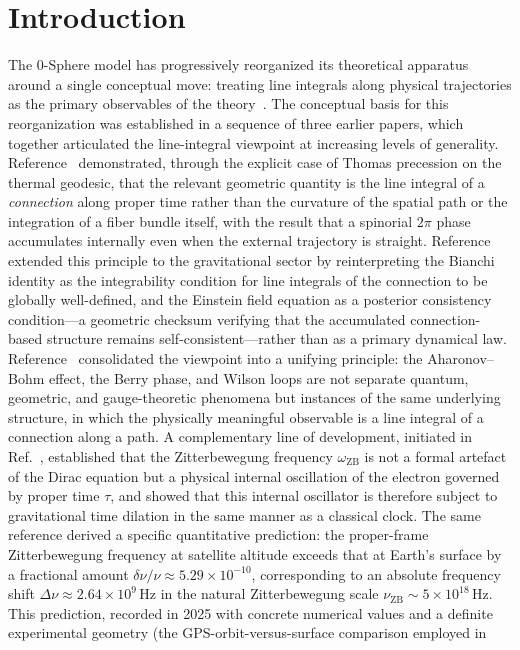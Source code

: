 \documentclass[%
 reprint, amsmath,amssymb, aps, prb, ]{revtex4-2}
\numberwithin{equation}{section}
\newcommand{\omZB}{\omega_{\text{ZB}}}
\begin{document}
\begin{abstract}
\end{abstract}

\maketitle

\section{Introduction}
\label{sec:intro}

The 0-Sphere model has progressively reorganized its theoretical apparatus around a single conceptual move: treating line integrals along physical trajectories as the primary observables of the theory~\cite{hanamura29, hanamura31, hanamura40, hanamura41}. The conceptual basis for this reorganization was established in a sequence of three earlier papers, which together articulated the line-integral viewpoint at increasing levels of generality. Reference~\cite{hanamura29} demonstrated, through the explicit case of Thomas precession on the thermal geodesic, that the relevant geometric quantity is the line integral of a \emph{connection} along proper time rather than the curvature of the spatial path or the integration of a fiber bundle itself, with the result that a spinorial $2\pi$ phase accumulates internally even when the external trajectory is straight. Reference~\cite{hanamura30} extended this principle to the gravitational sector by reinterpreting the Bianchi identity as the integrability condition for line integrals of the connection to be globally well-defined, and the Einstein field equation as a posterior consistency condition---a geometric checksum verifying that the accumulated connection-based structure remains self-consistent---rather than as a primary dynamical law. Reference~\cite{hanamura31} consolidated the viewpoint into a unifying principle: the Aharonov--Bohm effect, the Berry phase, and Wilson loops are not separate quantum, geometric, and gauge-theoretic phenomena but instances of the same underlying structure, in which the physically meaningful observable is a line integral of a connection along a path. A complementary line of development, initiated in Ref.~\cite{hanamura22}, established that the Zitterbewegung frequency $\omZB$ is not a formal artefact of the Dirac equation but a physical internal oscillation of the electron governed by proper time $\tau$, and showed that this internal oscillator is therefore subject to gravitational time dilation in the same manner as a classical clock. The same reference derived a specific quantitative prediction: the proper-frame Zitterbewegung frequency at satellite altitude exceeds that at Earth's surface by a fractional amount $\delta\nu/\nu \approx 5.29 \times 10^{-10}$, corresponding to an absolute frequency shift $\Delta\nu \approx 2.64 \times 10^{9}\,\text{Hz}$ in the natural Zitterbewegung scale $\nu_{\text{ZB}} \sim 5 \times 10^{18}\,\text{Hz}$. This prediction, recorded in 2025 with concrete numerical values and a definite experimental geometry (the GPS-orbit-versus-surface comparison employed in 
\end{document}
